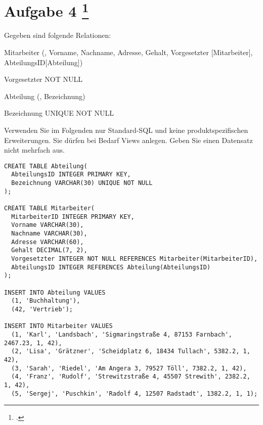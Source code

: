 \documentclass{lehramt-informatik-aufgabe}
\begin{document}
\section{Aufgabe 4
\footcite{66116:2021:03}}

Gegeben sind folgende Relationen:

\begin{liRmodell}
Mitarbeiter (, Vorname, Nachname, Adresse,
Gehalt, Vorgesetzter [Mitarbeiter], AbteilungsID[Abteilung])

Vorgesetzter NOT NULL

Abteilung (, Bezeichnung)

Bezeichnung UNIQUE NOT NULL
\end{liRmodell}

Verwenden Sie im Folgenden nur Standard-SQL und keine
produktspezifischen Erweiterungen. Sie dürfen bei Bedarf Views anlegen.
Geben Sie einen Datensatz nicht mehrfach aus.

\begin{verbatim}
CREATE TABLE Abteilung(
  AbteilungsID INTEGER PRIMARY KEY,
  Bezeichnung VARCHAR(30) UNIQUE NOT NULL
);

CREATE TABLE Mitarbeiter(
  MitarbeiterID INTEGER PRIMARY KEY,
  Vorname VARCHAR(30),
  Nachname VARCHAR(30),
  Adresse VARCHAR(60),
  Gehalt DECIMAL(7, 2),
  Vorgesetzter INTEGER NOT NULL REFERENCES Mitarbeiter(MitarbeiterID),
  AbteilungsID INTEGER REFERENCES Abteilung(AbteilungsID)
);

INSERT INTO Abteilung VALUES
  (1, 'Buchhaltung'),
  (42, 'Vertrieb');

INSERT INTO Mitarbeiter VALUES
  (1, 'Karl', 'Landsbach', 'Sigmaringstraße 4, 87153 Farnbach', 2467.23, 1, 42),
  (2, 'Lisa', 'Grätzner', 'Scheidplatz 6, 18434 Tullach', 5382.2, 1, 42),
  (3, 'Sarah', 'Riedel', 'Am Angera 3, 79527 Töll', 7382.2, 1, 42),
  (4, 'Franz', 'Rudolf', 'Strewitzstraße 4, 45507 Strewith', 2382.2, 1, 42),
  (5, 'Sergej', 'Puschkin', 'Radolf 4, 12507 Radstadt', 1382.2, 1, 1);

\end{verbatim}
\end{document}
